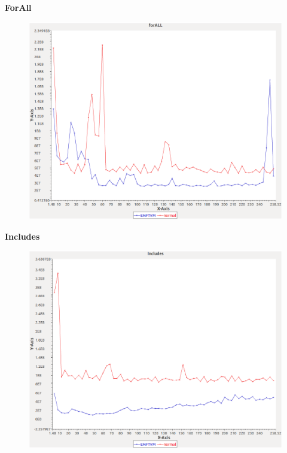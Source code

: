 \noindent\textbf{ForAll}

\begin{figure}[h]
\centering
\includegraphics[width=\textwidth]{graphs/set/forALL}
\end{figure}
\pagebreak

\noindent\textbf{Includes}

\begin{figure}[h]
\centering
\includegraphics[width=\textwidth]{graphs/set/Includes}
\end{figure}
\pagebreak

